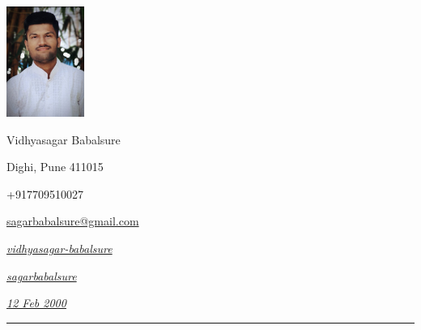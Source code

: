 \documentclass[a4paper,10pt]{article}
\newlength{\cvcolumngapwidth}
\newlength{\cvleftcolumnwidth}
\newlength{\cvrightcolumnwidth}
\newcommand{\cvnamestyle}[1]{{\Large\cvnamefont\textcolor{cvnamecolor}{#1}}}
\newcommand{\cvsectionstyle}[1]{{\normalsize\cvsectionfont\textcolor{cvsectioncolor}{#1}}}
\newlength{\cvafteritemskipamount}
\newlength{\cvaftersectionskipamount}
\newlength{\cvafternameskipamount}
\newlength{\cvafterpersonalinfolineskipamount}
\newcommand{\cvpersonalinfo}[2]{
    \begin{minipage}[t]{\cvleftcolumnwidth}
        \vspace{0mm} %
        \raggedleft #1
    \end{minipage}%
    \hspace{\cvcolumngapwidth}%
    \begin{minipage}[t]{\cvrightcolumnwidth}
        \vspace{0mm} %
        #2
    \end{minipage}

    \vspace{\cvafteritemskipamount}
}
\newcommand{\cvname}[1]{
    \cvnamestyle{#1}

    \vspace{\cvafternameskipamount}
}
\newcommand{\cvpersonalinfolinewithicon}[3]{
    \raisebox{.5\fontcharht\font`E-.5\height}{\texttt{[image: \#2]}}
    #3

    \vspace{\cvafterpersonalinfolineskipamount}
}
\newcommand{\cvsection}[1]{
    \begin{minipage}[t]{\cvleftcolumnwidth}
        \raggedleft\cvsectionstyle{#1}
    \end{minipage}%
    \hspace{\cvcolumngapwidth}%
    \begin{minipage}[t]{\cvrightcolumnwidth}
        \textcolor{cvrulecolor}{\rule{\cvrightcolumnwidth}{0.3mm}}
    \end{minipage}

    \vspace{\cvaftersectionskipamount}
}
\begin{document}

\cvpersonalinfo{
    \includegraphics[height=36mm]{profile.jpeg}
}{
    \cvname{Vidhyasagar Babalsure}

    \cvpersonalinfolinewithicon{height=4mm}{072-location.pdf}{
        Dighi, Pune 411015 
    }

    \cvpersonalinfolinewithicon{height=4mm}{067-phone.pdf}{
        +917709510027
    }

    \cvpersonalinfolinewithicon{height=4mm}{070-envelop.pdf}{
        \href{mailto:sagarbabalsure@gmail.com}{sagarbabalsure@gmail.com}
    }

    \cvpersonalinfolinewithicon{height=4mm}{458-linkedin.pdf}{
       \vspace{-0.5mm}\textit{\href{https://www.linkedin.com/in/vidhyasagar-babalsure-5277b8185/}{vidhyasagar-babalsure}}
        
    }
    
   \cvpersonalinfolinewithicon{height=4mm}{github.pdf}{
         \hspace{0.5mm}\textit{\href{https://github.com/sagarbabalsure}{sagarbabalsure}}
    }
    
    
    \vspace{-0.5mm}\hspace{-2.8mm}\cvpersonalinfolinewithicon{height=4mm}{Screenshot.png}{
        \hspace{-2mm}\textit{\href{}{12 Feb 2000}}
    }\vspace{-5mm}

   
}



\cvsection{PROJECTS}
\end{document}
